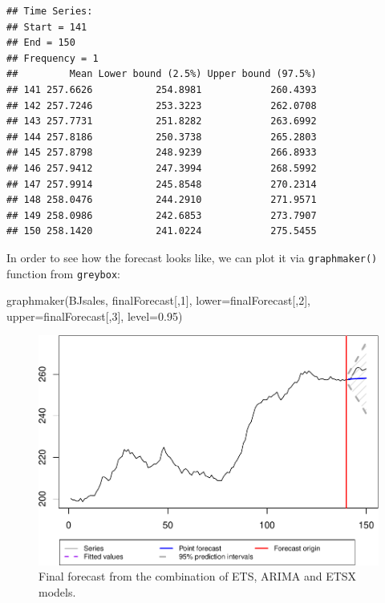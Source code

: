\documentclass[
]{book}
\newenvironment{Shaded}{\begin{snugshade}}{\end{snugshade}}
\newcommand{\AttributeTok}[1]{\textcolor[rgb]{0.77,0.63,0.00}{#1}}
\newcommand{\DecValTok}[1]{\textcolor[rgb]{0.00,0.00,0.81}{#1}}
\newcommand{\FloatTok}[1]{\textcolor[rgb]{0.00,0.00,0.81}{#1}}
\newcommand{\FunctionTok}[1]{\textcolor[rgb]{0.00,0.00,0.00}{#1}}
\newcommand{\NormalTok}[1]{#1}
\theoremstyle{definition}
\theoremstyle{definition}
\theoremstyle{definition}
\theoremstyle{definition}
\theoremstyle{remark}
\begin{document}
\begin{verbatim}
## Time Series:
## Start = 141 
## End = 150 
## Frequency = 1 
##         Mean Lower bound (2.5%) Upper bound (97.5%)
## 141 257.6626           254.8981            260.4393
## 142 257.7246           253.3223            262.0708
## 143 257.7731           251.8282            263.6992
## 144 257.8186           250.3738            265.2803
## 145 257.8798           248.9239            266.8933
## 146 257.9412           247.3994            268.5992
## 147 257.9914           245.8548            270.2314
## 148 258.0476           244.2910            271.9571
## 149 258.0986           242.6853            273.7907
## 150 258.1420           241.0224            275.5455
\end{verbatim}

In order to see how the forecast looks like, we can plot it via \texttt{graphmaker()} function from \texttt{greybox}:

\begin{Shaded}
\begin{Highlighting}[]
\FunctionTok{graphmaker}\NormalTok{(BJsales, finalForecast[,}\DecValTok{1}\NormalTok{],}
           \AttributeTok{lower=}\NormalTok{finalForecast[,}\DecValTok{2}\NormalTok{], }\AttributeTok{upper=}\NormalTok{finalForecast[,}\DecValTok{3}\NormalTok{],}
           \AttributeTok{level=}\FloatTok{0.95}\NormalTok{)}
\end{Highlighting}
\end{Shaded}

\begin{figure}
\centering
\includegraphics{Svetunkov--2022----ADAM_files/figure-latex/adamCombinedfinalForecast-1.pdf}
\caption{\label{fig:adamCombinedfinalForecast}Final forecast from the combination of ETS, ARIMA and ETSX models.}
\end{figure}
\end{document}
